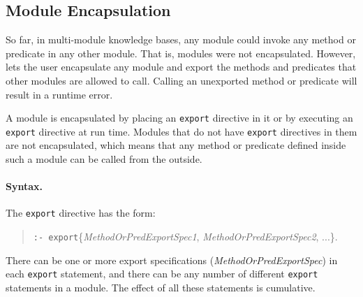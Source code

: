 \documentclass[11pt]{article}
\newcommand{\ERGO}{\mbox{\smaller{\ensuremath{\cal{E}}\smaller{{\sc{RGO}}}}}\xspace}
\newcommand{\FLSYSTEM}{\ERGO}
\begin{document}
\subsection{Module Encapsulation}\label{sec-module-encap}

So far, in multi-module knowledge bases, any module could invoke any method or
predicate in any other module. That is, modules were not encapsulated.
However, \FLSYSTEM lets the user encapsulate any module and export the
methods and predicates that other modules are allowed to call. Calling
an unexported method or predicate will result in a runtime error.

A module is encapsulated by placing an {\tt export} directive in it or by
executing an {\tt export} directive at run time.  Modules that do not have
{\tt export} directives in them are not encapsulated, which means that any
method or predicate defined inside such a module can be called from the outside.

\paragraph{Syntax.}
The {\tt export} directive has the form:
\begin{quote}
  {\tt :- export}\{\emph{MethodOrPredExportSpec1},
  \emph{MethodOrPredExportSpec2}, ...\}.
\end{quote}
There can be one or more export specifications
(\emph{MethodOrPredExportSpec}) in each {\tt export} statement, and there
can be any number of different {\tt export} statements in a module. The
effect of all 
these statements is cumulative.   
\end{document}
